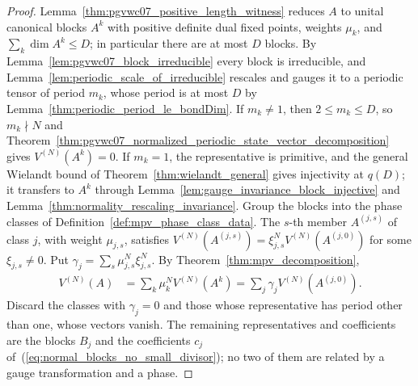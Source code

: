 \begin{proof}\leanok
    Lemma~\ref{thm:pgvwc07_positive_length_witness} reduces $A$ to unital
    canonical blocks $A^k$ with positive definite dual fixed points, weights
    $\mu_k$, and $\sum_k\dim A^k\le D$; in particular there are at most $D$
    blocks. By Lemma~\ref{lem:pgvwc07_block_irreducible} every block is
    irreducible, and Lemma~\ref{lem:periodic_scale_of_irreducible} rescales
    and gauges it to a periodic tensor of period $m_k$, whose period is at
    most $D$ by Lemma~\ref{thm:periodic_period_le_bondDim}. If $m_k\ne1$,
    then $2\le m_k\le D$, so $m_k\nmid N$ and
    Theorem~\ref{thm:pgvwc07_normalized_periodic_state_vector_decomposition}
    gives $V^{(N)}(A^k)=0$. If $m_k=1$, the representative is primitive, and
    the general Wielandt bound of Theorem~\ref{thm:wielandt_general} gives
    injectivity at $q(D)$; it transfers to $A^k$ through
    Lemma~\ref{lem:gauge_invariance_block_injective} and
    Lemma~\ref{thm:normality_rescaling_invariance}. Group the blocks into
    the phase classes of Definition~\ref{def:mpv_phase_class_data}. The
    $s$-th member $A^{(j,s)}$ of class $j$, with weight $\mu_{j,s}$, satisfies
    $V^{(N)}(A^{(j,s)})=\xi_{j,s}^NV^{(N)}(A^{(j,0)})$ for some
    $\xi_{j,s}\ne0$. Put $\gamma_j=\sum_s\mu_{j,s}^N\xi_{j,s}^N$. By
    Theorem~\ref{thm:mpv_decomposition},
    \begin{align}
        V^{(N)}(A) & =\sum_k\mu_k^NV^{(N)}(A^k)
        =\sum_j\gamma_jV^{(N)}(A^{(j,0)}).
    \end{align}
    Discard the classes with $\gamma_j=0$ and those whose representative
    has period other than one, whose vectors vanish. The remaining
    representatives and coefficients are the blocks $B_j$ and the
    coefficients $c_j$ of~(\ref{eq:normal_blocks_no_small_divisor}); no two
    of them are related by a gauge transformation and a phase.
\end{proof}

